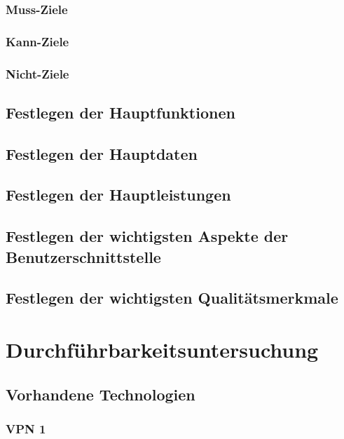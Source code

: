 \documentclass[a4paper,12pt]{scrreprt}
\begin{document}
		\subsection{Muss-Ziele}
			
		\subsection{Kann-Ziele}
			
			
		\subsection{Nicht-Ziele}
			
	\section{Festlegen der Hauptfunktionen}
		
	\section{Festlegen der Hauptdaten}
		
	\section{Festlegen der Hauptleistungen}
		
	\section{Festlegen der wichtigsten Aspekte der Benutzerschnittstelle}
		
	\section{Festlegen der wichtigsten Qualit\"atsmerkmale}
		
\chapter{Durchf\"uhrbarkeitsuntersuchung}

	\section{Vorhandene Technologien}
		
		\subsection{VPN 1}
		
\end{document}

